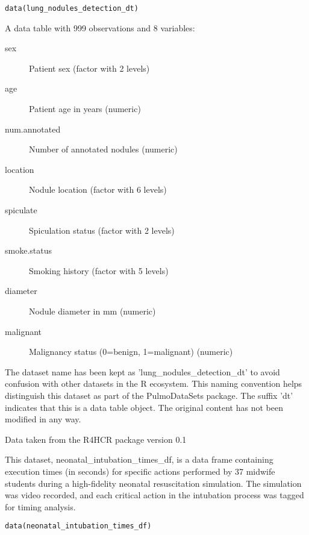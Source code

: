 \documentclass[a4paper]{book}
\begin{document}
%
\begin{Usage}
\begin{verbatim}
data(lung_nodules_detection_dt)
\end{verbatim}
\end{Usage}
%
\begin{Format}
A data table with 999 observations and 8 variables:
\begin{description}

\item[sex] Patient sex (factor with 2 levels)
\item[age] Patient age in years (numeric)
\item[num.annotated] Number of annotated nodules (numeric)
\item[location] Nodule location (factor with 6 levels)
\item[spiculate] Spiculation status (factor with 2 levels)
\item[smoke.status] Smoking history (factor with 5 levels)
\item[diameter] Nodule diameter in mm (numeric)
\item[malignant] Malignancy status (0=benign, 1=malignant) (numeric)

\end{description}

\end{Format}
%
\begin{Details}
The dataset name has been kept as 'lung\_nodules\_detection\_dt' to avoid confusion
with other datasets in the R ecosystem. This naming convention helps distinguish
this dataset as part of the PulmoDataSets package. The suffix 'dt' indicates
that this is a data table object. The original content has not been modified
in any way.
\end{Details}
%
\begin{Source}
Data taken from the R4HCR package version 0.1
\end{Source}
%
\begin{Description}
This dataset, neonatal\_intubation\_times\_df, is a data frame containing execution times (in seconds)
for specific actions performed by 37 midwife students during a high-fidelity neonatal resuscitation
simulation. The simulation was video recorded, and each critical action in the intubation process
was tagged for timing analysis.
\end{Description}
%
\begin{Usage}
\begin{verbatim}
data(neonatal_intubation_times_df)
\end{verbatim}
\end{Usage}
\end{document}
